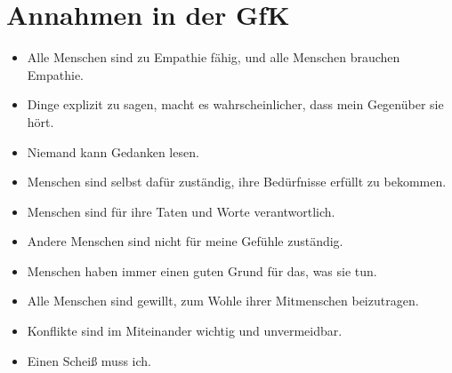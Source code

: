 \section{Annahmen in der GfK}
\label{gfk-annahmen}

\begin{itemize}
  \item Alle Menschen sind zu Empathie fähig, und alle Menschen brauchen Empathie.
  \item Dinge explizit zu sagen, macht es wahrscheinlicher, dass mein Gegenüber sie hört.
  \item Niemand kann Gedanken lesen.
  \item Menschen sind selbst dafür zuständig, ihre Bedürfnisse erfüllt zu bekommen.
  \item Menschen sind für ihre Taten und Worte verantwortlich.
  \item Andere Menschen sind nicht für meine Gefühle zuständig.
  \item Menschen haben immer einen guten Grund für das, was sie tun.
  \item Alle Menschen sind gewillt, zum Wohle ihrer Mitmenschen beizutragen.
  \item Konflikte sind im Miteinander wichtig und unvermeidbar.
  \item Einen Scheiß muss ich.
\end{itemize}
